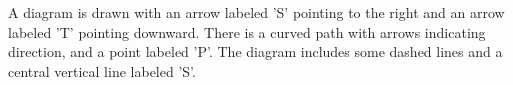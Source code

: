 A diagram is drawn with an arrow labeled 'S' pointing to the right and an arrow labeled 'T' pointing downward. There is a curved path with arrows indicating direction, and a point labeled 'P'. The diagram includes some dashed lines and a central vertical line labeled 'S'.